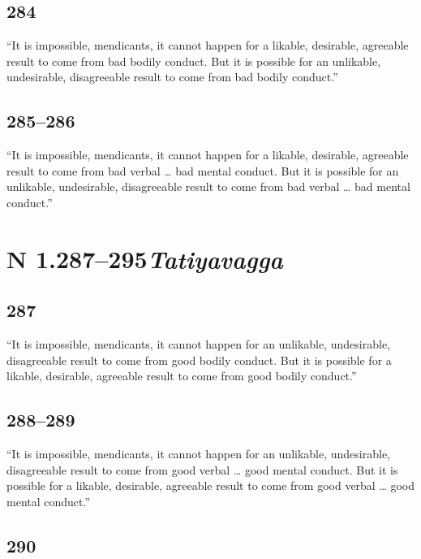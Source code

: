 \documentclass[12pt,openany]{book}%
\newcommand*{\suttatitleacronym}[1]{\smaller[2]{#1}\vspace*{.3em}}
\newcommand*{\suttatitleroot}[1]{\linebreak\smaller[2]\itshape{#1}}
\newcommand*{\tocacronym}[1]{\hspace*{-3.3em}{#1}\quad}
\newcommand*{\tocroot}[1]{(\textit{#1})}
\begin{document}
\subsection*{284 }

“It is impossible, mendicants, it cannot happen for a likable, desirable, agreeable result to come from bad bodily conduct. But it is possible for an unlikable, undesirable, disagreeable result to come from bad bodily conduct.” 

\subsection*{285–286 }

“It is impossible, mendicants, it cannot happen for a likable, desirable, agreeable result to come from bad verbal … bad mental conduct. But it is possible for an unlikable, undesirable, disagreeable result to come from bad verbal … bad mental conduct.” 

%
\section*{{\suttatitleacronym AN 1.287–295}{\suttatitleroot Tatiyavagga}}
\addcontentsline{toc}{section}{\tocacronym{AN 1.287–295} \tocroot{Tatiyavagga}}

\subsection*{287 }

“It is impossible, mendicants, it cannot happen for an unlikable, undesirable, disagreeable result to come from good bodily conduct. But it is possible for a likable, desirable, agreeable result to come from good bodily conduct.” 

\subsection*{288–289 }

“It is impossible, mendicants, it cannot happen for an unlikable, undesirable, disagreeable result to come from good verbal … good mental conduct. But it is possible for a likable, desirable, agreeable result to come from good verbal … good mental conduct.” 

\subsection*{290 }
\end{document}
